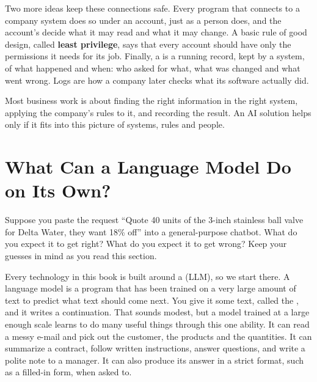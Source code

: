 Two more ideas keep these connections safe. Every program that connects to a company system does so under an account, just as a person does, and the account's  decide what it may read and what it may change. A basic rule of good design, called \textbf{least privilege}, says that every account should have only the permissions it needs for its job. Finally, a  is a running record, kept by a system, of what happened and when: who asked for what, what was changed and what went wrong. Logs are how a company later checks what its software actually did.

\begin{keyidea}
Most business work is about finding the right information in the right system, applying the company's rules to it, and recording the result. An AI solution helps only if it fits into this picture of systems, rules and people.
\end{keyidea}

\section{What Can a Language Model Do on Its Own?}
\label{sec:llm}

\begin{thinkabout}
Suppose you paste the request ``Quote 40 units of the 3-inch stainless ball valve for Delta Water, they want 18\% off'' into a general-purpose chatbot. What do you expect it to get right? What do you expect it to get wrong? Keep your guesses in mind as you read this section.
\end{thinkabout}

Every technology in this book is built around a  (LLM), so we start there. A language model is a program that has been trained on a very large amount of text to predict what text should come next. You give it some text, called the , and it writes a continuation. That sounds modest, but a model trained at a large enough scale learns to do many useful things through this one ability. It can read a messy e-mail and pick out the customer, the products and the quantities. It can summarize a contract, follow written instructions, answer questions, and write a polite note to a manager. It can also produce its answer in a strict format, such as a filled-in form, when asked to.

